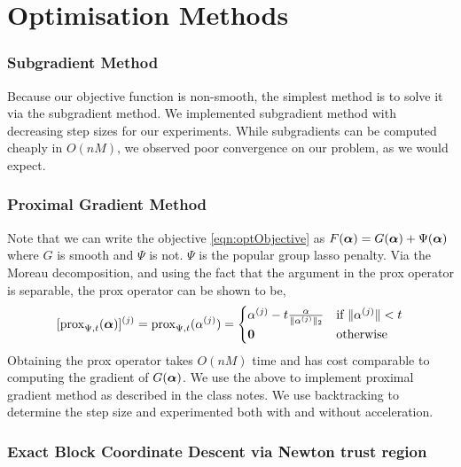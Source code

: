 
\section{Optimisation Methods}
\label{sec:optMethods}

\subsubsection*{Subgradient Method}
Because our objective function is non-smooth, the simplest method is to solve it via 
the subgradient method. We implemented subgradient method with 
decreasing step sizes for our experiments. 
While subgradients can be computed cheaply in $O(nM)$, we observed poor convergence on 
our problem, as we would expect.

\subsubsection*{Proximal Gradient Method}

Note that we can write the objective \eqref{eqn:optObjective} as $F({\bm{\alpha}}) =
G({\bm{\alpha}}) + \Psi({\bm{\alpha}})$ where $G$ is smooth and $\Psi$ is not. $\Psi$ is the
popular group lasso penalty. Via the Moreau decomposition, and using the fact
that the argument in the prox operator is separable, the prox operator can
be shown to be,
\[
[{\bf{\rm prox}}_{\Psi, t} ({\bm{\alpha}})]^{(j)} =
{\bf{\rm prox}}_{\Psi, t} ({\alpha^{(j)}}) = 
  \begin{cases}
    {\alpha^{(j)}} - t \frac{\alpha}{\|{\alpha^{(j)}}\|_2} & \text{if } 
              \|{\alpha^{(j)}}\| < t \\
    {\bf 0} & \text{otherwise}
  \end{cases}
\]
Obtaining the prox operator takes $O(nM)$ time and has cost comparable to
computing the gradient of $G({\bm{\alpha}})$. We use the above to implement proximal
gradient method as described in the class notes. We use backtracking to
determine the step size and experimented both with and without acceleration.

\subsubsection*{Exact Block Coordinate Descent via Newton trust region}

